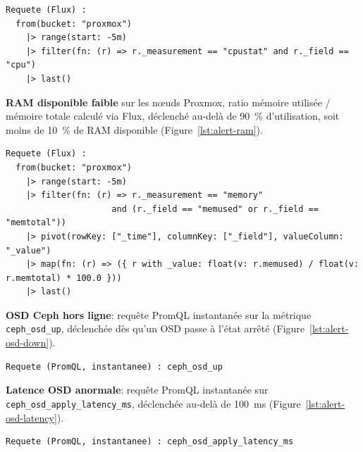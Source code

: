 \begin{lstlisting}[style=sonacode,language={},caption={Règle d'alerte, Charge CPU élevée sur les nœuds Proxmox},label={lst:alert-cpu}]
Requete (Flux) :
  from(bucket: "proxmox")
    |> range(start: -5m)
    |> filter(fn: (r) => r._measurement == "cpustat" and r._field == "cpu")
    |> last()
\end{lstlisting}

\medskip
\par \textbf{\textcolor{bleu}{RAM disponible faible}} sur les nœuds Proxmox, ratio mémoire utilisée / mémoire totale calculé via Flux, déclenché au-delà de 90~\% d'utilisation, soit moins de 10~\% de RAM disponible (Figure~\ref{lst:alert-ram}).\\

\begin{lstlisting}[style=sonacode,language={},caption={Règle d'alerte, RAM disponible faible sur les nœuds Proxmox},label={lst:alert-ram}]
Requete (Flux) :
  from(bucket: "proxmox")
    |> range(start: -5m)
    |> filter(fn: (r) => r._measurement == "memory"
                     and (r._field == "memused" or r._field == "memtotal"))
    |> pivot(rowKey: ["_time"], columnKey: ["_field"], valueColumn: "_value")
    |> map(fn: (r) => ({ r with _value: float(v: r.memused) / float(v: r.memtotal) * 100.0 }))
    |> last()
\end{lstlisting}

\medskip
\par \textbf{\textcolor{bleu}{OSD Ceph hors ligne}}: requête PromQL instantanée sur la métrique \texttt{ceph\_osd\_up}, déclenchée dès qu'un OSD passe à l'état arrêté (Figure~\ref{lst:alert-osd-down}).\\

\begin{lstlisting}[style=sonacode,language={},caption={Règle d'alerte - OSD Ceph hors ligne},label={lst:alert-osd-down}]
Requete (PromQL, instantanee) : ceph_osd_up
\end{lstlisting}

\medskip
\par \textbf{\textcolor{bleu}{Latence OSD anormale}}: requête PromQL instantanée sur \texttt{ceph\_osd\_apply\_latency\_ms}, déclenchée au-delà de 100~ms (Figure~\ref{lst:alert-osd-latency}).\\

\begin{lstlisting}[style=sonacode,language={},caption={Règle d'alerte - Latence OSD Ceph élevée},label={lst:alert-osd-latency}]
Requete (PromQL, instantanee) : ceph_osd_apply_latency_ms
\end{lstlisting}

